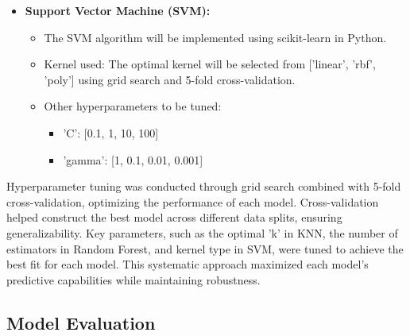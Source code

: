 \documentclass[conference]{IEEEtran}
\begin{document}
\begin{itemize}
\item \textbf{Support Vector Machine (SVM):}
    \begin{itemize}
    \item The SVM algorithm will be implemented using scikit-learn in Python. 
    \item Kernel used: The optimal kernel will be selected from ['linear', 'rbf', 'poly'] using grid search and 5-fold cross-validation. 
    \item Other hyperparameters to be tuned: 
        \begin{itemize}
        \item 'C': [0.1, 1, 10, 100] 
        \item  'gamma': [1, 0.1, 0.01, 0.001] 
        \end{itemize}
    \end{itemize}
\end{itemize}

Hyperparameter tuning was conducted through grid search combined with 5-fold cross-validation, optimizing the performance of each model. Cross-validation helped construct the best model across different data splits, ensuring generalizability. Key parameters, such as the optimal 'k' in KNN, the number of estimators in Random Forest, and kernel type in SVM, were tuned to achieve the best fit for each model. This systematic approach maximized each model’s predictive capabilities while maintaining robustness.
\subsection{Model Evaluation}
\end{document}
